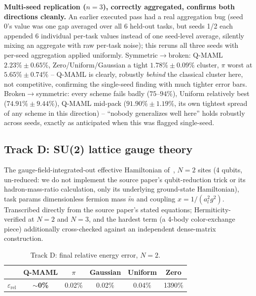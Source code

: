 \documentclass[11pt]{article}
\begin{document}
\begin{keyresult}
\textbf{Multi-seed replication ($n{=}3$), correctly aggregated, confirms both directions cleanly.} An
earlier executed pass had a real aggregation bug (seed 0's value was one gap averaged over all 6 held-out
tasks, but seeds 1/2 each appended 6 individual per-task values instead of one seed-level average, silently
mixing an aggregate with raw per-task noise); this reruns all three seeds with per-seed aggregation applied
uniformly. Symmetric$\to$broken: Q-MAML $2.23\%\pm0.65\%$, Zero/Uniform/Gaussian a tight
$1.78\%\pm0.09\%$ cluster, $\pi$ worst at $5.65\%\pm0.74\%$ -- Q-MAML is clearly, robustly \emph{behind}
the classical cluster here, not competitive, confirming the single-seed finding with much tighter error
bars. Broken$\to$symmetric: every scheme fails badly ($75$--$94\%$), Uniform relatively best
($74.91\%\pm9.44\%$), Q-MAML mid-pack ($91.90\%\pm1.19\%$, its own tightest spread of any scheme in this
direction) -- ``nobody generalizes well here'' holds robustly across seeds, exactly as anticipated when
this was flagged single-seed.
\end{keyresult}

\FloatBarrier
\subsection{Track D: SU(2) lattice gauge theory}
\label{sec:track-d}
The gauge-field-integrated-out effective Hamiltonian of~\citep{su2hadrons2021}, $N=2$ sites (4 qubits,
un-reduced: we do not implement the source paper's qubit-reduction trick or its hadron-mass-ratio
calculation, only its underlying ground-state Hamiltonian), task params dimensionless fermion mass
$\tilde m$ and coupling $x=1/(a_l^2g^2)$. Transcribed directly from the source paper's stated equations;
Hermiticity-verified at $N=2$ and $N=3$, and the hardest term (a 4-body color-exchange piece) additionally
cross-checked against an independent dense-matrix construction.

\begin{table}[ht]
\centering
\caption{Track D: final relative energy error, $N{=}2$.}
\label{tab:su2lgt}
\begin{tabular}{lccccc}
\toprule
& Q-MAML & $\pi$ & Gaussian & Uniform & Zero \\
\midrule
$\varepsilon_{\mathrm{rel}}$ & \textbf{$\sim$0\%} & 0.02\% & 0.02\% & 0.04\% & 1390\% \\
\bottomrule
\end{tabular}
\end{table}
\end{document}
